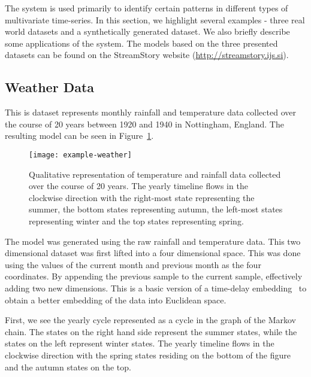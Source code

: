 The system is used primarily to identify certain patterns in different types of multivariate time-series. In this section, we highlight several examples -  three real world datasets and a synthetically generated dataset.  We also briefly describe some applications of the system.  The models based on the three presented datasets can be found on the StreamStory website (\url{http://streamstory.ijs.si}). 



\subsection{Weather Data}
\label{sec:experiments-weather}
This is dataset represents monthly rainfall and temperature data
collected over the course of 20 years between 1920 and 1940 in Nottingham, England\cite{tsdl}. 
The resulting model can be seen in Figure~\ref{fig:example-weather}. 

\begin{figure}[h!]
	\centering
	\texttt{[image: example-weather]}
	\caption{Qualitative representation of temperature and rainfall data collected over the course of 20 years. The yearly timeline flows in the clockwise direction with the right-most state representing the summer, the bottom states representing autumn, the left-most states representing winter and the top states representing spring.}
	\label{fig:example-weather}
\end{figure}

The model was generated using the raw rainfall and temperature data. This two dimensional dataset was first  lifted into a four dimensional space. This was done using the values of the current month and previous month as the four coordinates.
By appending the previous sample to the current sample, effectively adding two new dimensions. This is a basic version of a time-delay embedding~\cite{sauer1991embedology} to obtain a better embedding of the data into Euclidean space.

First, we see the yearly cycle represented as a cycle in the graph of the Markov chain. 
The states on the right hand side represent the 
summer states, while the states on the left represent winter states. The yearly timeline flows in the clockwise direction with the spring states residing on the bottom of the figure and the autumn
states on the top.

